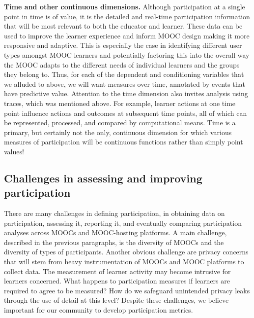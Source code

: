 \textbf{Time and other continuous dimensions.}  Although participation
at a single point in time is of value, it is the detailed and real-time
participation information that will be most relevant to both the
educator and learner. These data can be used to improve the learner
experience and inform MOOC design making it more responsive and
adaptive. This is especially the case in identifying different user
types amongst MOOC learners and potentially factoring this into the
overall way the MOOC adapts to the different needs of individual
learners and the groups they belong to. Thus, for each of the dependent
and conditioning variables that we alluded to above, we will want
measures over time, annotated by events that have predictive value.
Attention to the time dimension also invites analysis using traces,
which was mentioned above. For example, learner actions at one time
point influence actions and outcomes at subsequent time points, all of
which can be represented, processed, and compared by computational
means.  Time is a primary, but certainly not the only, continuous
dimension for which various measures of participation will be continuous
functions rather than simply point values!

\subsection{Challenges in assessing and improving participation}

 There are many challenges in defining participation, in
obtaining data on participation, assessing it, reporting it, and
eventually comparing participation analyses across MOOCs and
MOOC-hosting platforms. A main challenge, described in the previous
paragraphs, is the diversity of MOOCs and the diversity of types of
participants. Another obvious challenge are privacy concerns that will
stem from heavy instrumentation of MOOCs and MOOC platforms to collect
data. The measurement of learner activity may become intrusive for
learners concerned. What happens to participation measures if learners
are required to agree to be measured? How do we safeguard unintended
privacy leaks through the use of detail at this level?  Despite these
challenges, we believe important for our community to develop
participation metrics. 



